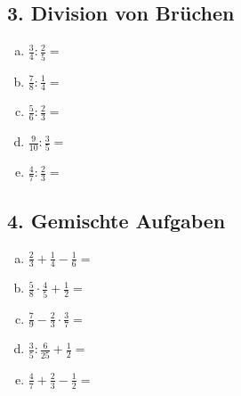 \subsection*{3. Division von Brüchen}
\begin{multicols}{2}
\begin{enumerate}[a)]
    \item $\displaystyle \frac{3}{4} : \frac{2}{5} =$
    \item $\displaystyle \frac{7}{8} : \frac{1}{4} =$
    \item $\displaystyle \frac{5}{6} : \frac{2}{3} =$
    \item $\displaystyle \frac{9}{10} : \frac{3}{5} =$
    \item $\displaystyle \frac{4}{7} : \frac{2}{3} =$
\end{enumerate}
\end{multicols}

\vspace{0.5cm}

\subsection*{4. Gemischte Aufgaben}
\begin{multicols}{2}
\begin{enumerate}[a)]
    \item $\displaystyle \frac{2}{3} + \frac{1}{4} - \frac{1}{6} =$
    \item $\displaystyle \frac{5}{8} \cdot \frac{4}{5} + \frac{1}{2} =$
    \item $\displaystyle \frac{7}{9} - \frac{2}{3} \cdot \frac{3}{7} =$
    \item $\displaystyle \frac{3}{5} : \frac{6}{25} + \frac{1}{2} =$
    \item $\displaystyle \frac{4}{7} + \frac{2}{3} - \frac{1}{2} =$
\end{enumerate}
\end{multicols}

\vspace{0.5cm}

